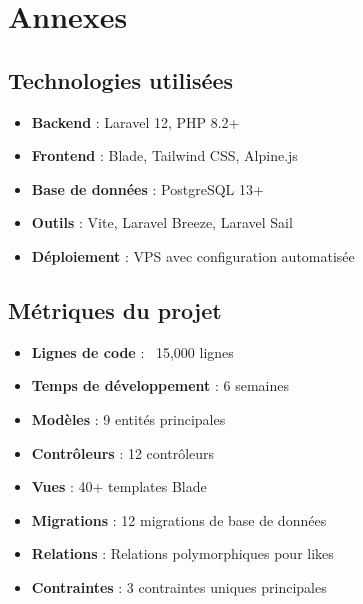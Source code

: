 \documentclass[12pt,a4paper]{article}
\begin{document}
\section{Annexes}

\subsection{Technologies utilis\'ees}
\begin{itemize}
    \item \textbf{Backend} : Laravel 12, PHP 8.2+
    \item \textbf{Frontend} : Blade, Tailwind CSS, Alpine.js
    \item \textbf{Base de donn\'ees} : PostgreSQL 13+
    \item \textbf{Outils} : Vite, Laravel Breeze, Laravel Sail
    \item \textbf{D\'eploiement} : VPS avec configuration automatis\'ee
\end{itemize}

\subsection{M\'etriques du projet}
\begin{itemize}
    \item \textbf{Lignes de code} : ~15,000 lignes
    \item \textbf{Temps de d\'eveloppement} : 6 semaines
    \item \textbf{Mod\`eles} : 9 entit\'es principales
    \item \textbf{Contr\^oleurs} : 12 contr\^oleurs
    \item \textbf{Vues} : 40+ templates Blade
    \item \textbf{Migrations} : 12 migrations de base de donn\'ees
    \item \textbf{Relations} : Relations polymorphiques pour likes
    \item \textbf{Contraintes} : 3 contraintes uniques principales
\end{itemize}
\end{document}
